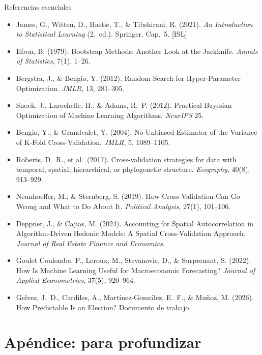 \documentclass{beamer}
\newcommand{\1}{\mathbb{I}}
\begin{document}
\begin{frame}{Referencias esenciales}
\scriptsize
\begin{itemize}\itemsep2pt
  \item James, G., Witten, D., Hastie, T., \& Tibshirani, R. (2021). \emph{An Introduction to Statistical Learning} (2.\ ed.). Springer. Cap.\ 5. [ISL]
  \item Efron, B. (1979). Bootstrap Methods: Another Look at the Jackknife. \emph{Annals of Statistics}, 7(1), 1--26.
  \item Bergstra, J., \& Bengio, Y. (2012). Random Search for Hyper-Parameter Optimization. \emph{JMLR}, 13, 281--305.
  \item Snoek, J., Larochelle, H., \& Adams, R.\ P. (2012). Practical Bayesian Optimization of Machine Learning Algorithms. \emph{NeurIPS} 25.
  \item Bengio, Y., \& Grandvalet, Y. (2004). No Unbiased Estimator of the Variance of K-Fold Cross-Validation. \emph{JMLR}, 5, 1089--1105.
  \item Roberts, D.\ R., et al.\ (2017). Cross-validation strategies for data with temporal, spatial, hierarchical, or phylogenetic structure. \emph{Ecography}, 40(8), 913--929.
  \item Neunhoeffer, M., \& Sternberg, S. (2019). How Cross-Validation Can Go Wrong and What to Do About It. \emph{Political Analysis}, 27(1), 101--106.
  \item Deppner, J., \& Cajias, M. (2024). Accounting for Spatial Autocorrelation in Algorithm-Driven Hedonic Models: A Spatial Cross-Validation Approach. \emph{Journal of Real Estate Finance and Economics}.
  \item Goulet Coulombe, P., Leroux, M., Stevanovic, D., \& Surprenant, S. (2022). How Is Machine Learning Useful for Macroeconomic Forecasting? \emph{Journal of Applied Econometrics}, 37(5), 920--964.
  \item Gelvez, J.\ D., Cardiles, A., Martínez-González, E.\ F., \& Muñoz, M. (2026). How Predictable Is an Election? Documento de trabajo.
\end{itemize}
\normalsize
\end{frame}


\appendix
\section{Apéndice: para profundizar}
\begin{frame}[noframenumbering]
\tableofcontents[currentsection]
\end{frame}
\end{document}
